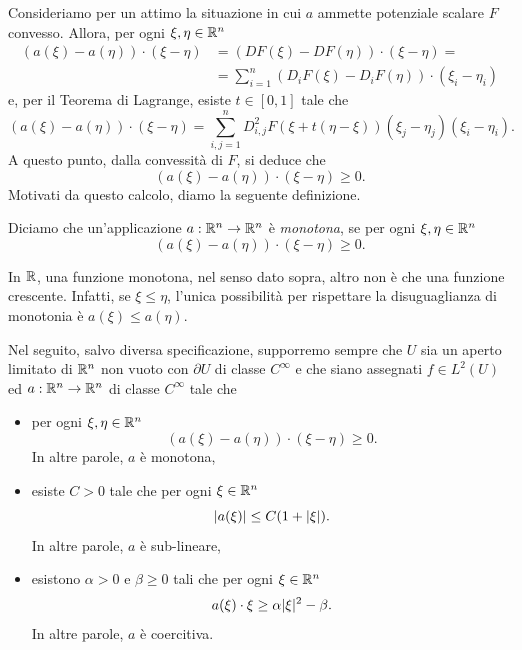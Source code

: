 Consideriamo per un attimo la situazione in cui $a$ ammette potenziale scalare $F$ convesso. Allora, per ogni $\xi,\eta \in \mathbb{R}^n$
\begin{align*}
	(a(\xi) - a(\eta))\cdot (\xi - \eta) &= (DF(\xi)- DF(\eta))\cdot(\xi-\eta) = \\
	&= \sum_{i=1}^n (D_iF(\xi)- D_iF(\eta))\cdot(\xi_i-\eta_i)
\end{align*}
e, per il Teorema di Lagrange, esiste $t \in [0,1]$ tale che
\[ 	(a(\xi) - a(\eta))\cdot (\xi - \eta) = \sum_{i,j=1}^n D^2_{i,j}F(\xi + t(\eta - \xi))(\xi_j - \eta_j)(\xi_i - \eta_i).  \]
A questo punto, dalla convessità di $F$, si deduce che
\[ (a(\xi) - a(\eta))\cdot (\xi - \eta) \ge 0. \]
Motivati da questo calcolo, diamo la seguente definizione.
\begin{definizione}
	Diciamo che un'applicazione $a: \mathbb{R}^n \to \mathbb{R}^n$ è \emph{monotona}, se per ogni $\xi,\eta \in \mathbb{R}^n$
	\[ (a(\xi) - a(\eta))\cdot (\xi - \eta) \ge 0. \]
\end{definizione}
\begin{osservazione}
	In $\mathbb{R}$, una funzione monotona, nel senso dato sopra, altro non è che una funzione crescente. Infatti, se $\xi \le \eta$, l'unica possibilità per rispettare la disuguaglianza di monotonia è $a(\xi) \le a(\eta)$.
\end{osservazione}

Nel seguito, salvo diversa specificazione, supporremo sempre che $U$ sia un aperto limitato di $\mathbb{R}^n$ non vuoto con $\partial U$ di classe $C^\infty$ e che siano assegnati $f \in L^2(U)$ ed $a: \mathbb{R}^n \to \mathbb{R}^n$ di classe $C^\infty$ tale che
\begin{itemize}
	\item per ogni $\xi,\eta \in \mathbb{R}^n$
	\[ (a(\xi) - a(\eta))\cdot (\xi - \eta) \ge 0. \]
	In altre parole, $a$ è monotona,
	\item esiste $C >0$ tale che per ogni $\xi \in \mathbb{R}^n$ 
	\[ \lvert a(\xi)\rvert \le C(1+\lvert\xi\rvert).\]
	In altre parole, $a$ è sub-lineare,
	\item esistono $\alpha > 0$ e $\beta \ge 0$ tali che per ogni $\xi \in \mathbb{R}^n$
	\[ a(\xi)\cdot \xi \ge \alpha \lvert\xi\rvert^2 - \beta.\]
	In altre parole, $a$ è coercitiva.
\end{itemize}

